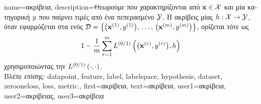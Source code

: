 {name={\foreignlanguage{greek}{ακρίβεια}},
	description={\foreignlanguage{greek}{Θεωρούμε} 
		 \foreignlanguage{greek}{που χαρακτηρίζονται από}  ${\bf x} \in \mathcal{X}$ 
		\foreignlanguage{greek}{και μία κατηγορική} 
		$y$ \foreignlanguage{greek}{που παίρνει τιμές από ένα πεπερασμένο}  $\mathcal{Y}$. 
		\foreignlanguage{greek}{Η ακρίβεις μίας}  
		$h: \mathcal{X} \rightarrow \mathcal{Y}$, \foreignlanguage{greek}{όταν εφαρμόζεται στα}  
		 \foreignlanguage{greek}{ενός}  
		$\mathcal{D} = \big\{ \big({\bf x}^{(1)}, y^{(1)} \big), \,\ldots, \,\big({\bf x}^{(m)},y^{(m)}\big) \big\}$, 
		\foreignlanguage{greek}{ορίζεται τότε ως} 
		$$1 - \frac{1}{m} \sum_{r=1}^{m} L^{(0/1)}\left(\big({\bf x}^{(r)},y^{(r)}\big),h \right)$$ 
		\foreignlanguage{greek}{χρησιμοποιώντας την}  $L^{(0/1)}\left(\cdot,\cdot \right)$.\\
		\foreignlanguage{greek}{Βλέπε επίσης:} \gls{datapoint}, \gls{feature}, \gls{label}, \gls{labelspace}, \gls{hypothesis}, \gls{dataset}, \gls{zerooneloss}, 
		\gls{loss}, \gls{metric}.},
	first={\foreignlanguage{greek}{ακρίβεια}},
	text={\foreignlanguage{greek}{ακρίβεια}},
	user1={\foreignlanguage{greek}{ακρίβεια}}, %
	user2={\foreignlanguage{greek}{ακρίβειας}}, %
	user3={\foreignlanguage{greek}{ακρίβεια}} %
}

